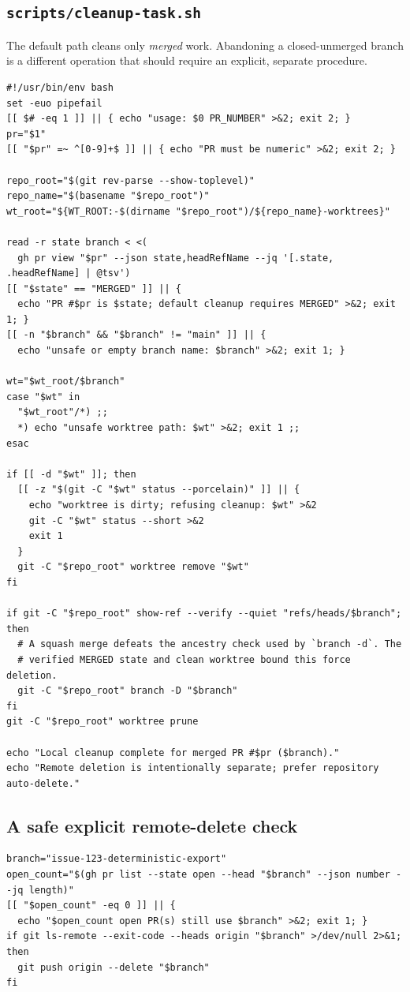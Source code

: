 \documentclass[11pt]{article}
\begin{document}
\subsection{\texttt{scripts/cleanup-task.sh}}

The default path cleans only \emph{merged} work. Abandoning a closed-unmerged branch is a
different operation that should require an explicit, separate procedure.

\begin{lstlisting}[style=gw]
#!/usr/bin/env bash
set -euo pipefail
[[ $# -eq 1 ]] || { echo "usage: $0 PR_NUMBER" >&2; exit 2; }
pr="$1"
[[ "$pr" =~ ^[0-9]+$ ]] || { echo "PR must be numeric" >&2; exit 2; }

repo_root="$(git rev-parse --show-toplevel)"
repo_name="$(basename "$repo_root")"
wt_root="${WT_ROOT:-$(dirname "$repo_root")/${repo_name}-worktrees}"

read -r state branch < <(
  gh pr view "$pr" --json state,headRefName --jq '[.state, .headRefName] | @tsv')
[[ "$state" == "MERGED" ]] || {
  echo "PR #$pr is $state; default cleanup requires MERGED" >&2; exit 1; }
[[ -n "$branch" && "$branch" != "main" ]] || {
  echo "unsafe or empty branch name: $branch" >&2; exit 1; }

wt="$wt_root/$branch"
case "$wt" in
  "$wt_root"/*) ;;
  *) echo "unsafe worktree path: $wt" >&2; exit 1 ;;
esac

if [[ -d "$wt" ]]; then
  [[ -z "$(git -C "$wt" status --porcelain)" ]] || {
    echo "worktree is dirty; refusing cleanup: $wt" >&2
    git -C "$wt" status --short >&2
    exit 1
  }
  git -C "$repo_root" worktree remove "$wt"
fi

if git -C "$repo_root" show-ref --verify --quiet "refs/heads/$branch"; then
  # A squash merge defeats the ancestry check used by `branch -d`. The
  # verified MERGED state and clean worktree bound this force deletion.
  git -C "$repo_root" branch -D "$branch"
fi
git -C "$repo_root" worktree prune

echo "Local cleanup complete for merged PR #$pr ($branch)."
echo "Remote deletion is intentionally separate; prefer repository auto-delete."
\end{lstlisting}

\subsection{A safe explicit remote-delete check}

\begin{lstlisting}[style=gw]
branch="issue-123-deterministic-export"
open_count="$(gh pr list --state open --head "$branch" --json number --jq length)"
[[ "$open_count" -eq 0 ]] || {
  echo "$open_count open PR(s) still use $branch" >&2; exit 1; }
if git ls-remote --exit-code --heads origin "$branch" >/dev/null 2>&1; then
  git push origin --delete "$branch"
fi
\end{lstlisting}
\end{document}
